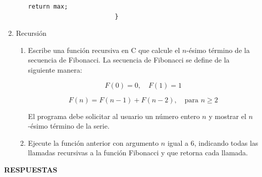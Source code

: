 \documentclass[12pt]{article}
\begin{document}
\begin{titlepage}
\begin{enumerate}
\begin{enumerate}[label*=\arabic*.]
\begin{lstlisting}[xleftmargin=-14.4em]
                            return max;
                        }
                    \end{lstlisting}

            \end{enumerate}
            \item Recursión
            \begin{enumerate}[label*=\arabic*.]
                \item Escribe una función recursiva en C que calcule el $n$-ésimo término de la secuencia de Fibonacci. La secuencia de Fibonacci se define de la siguiente manera:

                \[
                F(0) = 0, \quad F(1) = 1
                \]
                
                \[
                F(n) = F(n-1) + F(n-2), \quad \text{para } n \geq 2
                \]
                
                El programa debe solicitar al usuario un número entero $n$ y mostrar el $n$-ésimo término de la serie.
                \item Ejecute la función anterior con argumento $n$ igual a 6, indicando todas las llamadas recursivas a la función Fibonacci y que retorna cada llamada.
            \end{enumerate}
        \end{enumerate}
    \end{titlepage}

    \newpage
        \begin{center}
            \textbf{RESPUESTAS}
        \end{center}
\end{document}

